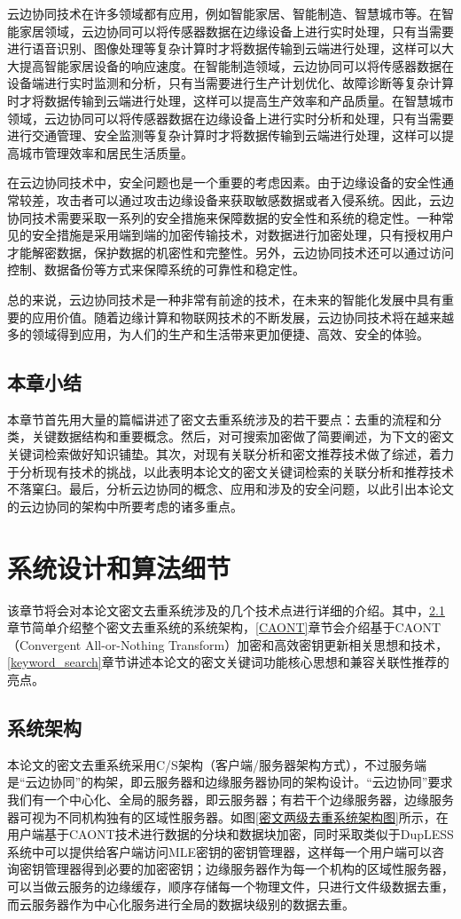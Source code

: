 \documentclass[promaster]{thesis-uestc}
\begin{document}
云边协同技术在许多领域都有应用，例如智能家居、智能制造、智慧城市等。在智能家居领域，云边协同可以将传感器数据在边缘设备上进行实时处理，只有当需要进行语音识别、图像处理等复杂计算时才将数据传输到云端进行处理，这样可以大大提高智能家居设备的响应速度。在智能制造领域，云边协同可以将传感器数据在设备端进行实时监测和分析，只有当需要进行生产计划优化、故障诊断等复杂计算时才将数据传输到云端进行处理，这样可以提高生产效率和产品质量。在智慧城市领域，云边协同可以将传感器数据在边缘设备上进行实时分析和处理，只有当需要进行交通管理、安全监测等复杂计算时才将数据传输到云端进行处理，这样可以提高城市管理效率和居民生活质量。

在云边协同技术中，安全问题也是一个重要的考虑因素。由于边缘设备的安全性通常较差，攻击者可以通过攻击边缘设备来获取敏感数据或者入侵系统。因此，云边协同技术需要采取一系列的安全措施来保障数据的安全性和系统的稳定性。一种常见的安全措施是采用端到端的加密传输技术，对数据进行加密处理，只有授权用户才能解密数据，保护数据的机密性和完整性。另外，云边协同技术还可以通过访问控制、数据备份等方式来保障系统的可靠性和稳定性。

总的来说，云边协同技术是一种非常有前途的技术，在未来的智能化发展中具有重要的应用价值。随着边缘计算和物联网技术的不断发展，云边协同技术将在越来越多的领域得到应用，为人们的生产和生活带来更加便捷、高效、安全的体验。
\section{本章小结}
本章节首先用大量的篇幅讲述了密文去重系统涉及的若干要点：去重的流程和分类，关键数据结构和重要概念。然后，对可搜索加密做了简要阐述，为下文的密文关键词检索做好知识铺垫。其次，对现有关联分析和密文推荐技术做了综述，着力于分析现有技术的挑战，以此表明本论文的密文关键词检索的关联分析和推荐技术不落窠臼。最后，分析云边协同的概念、应用和涉及的安全问题，以此引出本论文的云边协同的架构中所要考虑的诸多重点。

\chapter{系统设计和算法细节}\label{系统设计和技术细节}
该章节将会对本论文密文去重系统涉及的几个技术点进行详细的介绍。其中，\ref{系统架构}章节简单介绍整个密文去重系统的系统架构，\ref{CAONT}章节会介绍基于CAONT（Convergent All-or-Nothing Transform）加密和高效密钥更新相关思想和技术，\ref{keyword_search}章节讲述本论文的密文关键词功能核心思想和兼容关联性推荐的亮点。

\section{系统架构}\label{系统架构}
本论文的密文去重系统采用C/S架构（客户端/服务器架构方式），不过服务端是“云边协同”的构架，即云服务器和边缘服务器协同的架构设计。“云边协同”要求我们有一个中心化、全局的服务器，即云服务器；有若干个边缘服务器，边缘服务器可视为不同机构独有的区域性服务器。如图\ref{密文两级去重系统架构图}所示，在用户端基于CAONT技术进行数据的分块和数据块加密，同时采取类似于DupLESS系统中可以提供给客户端访问MLE密钥的密钥管理器，这样每一个用户端可以咨询密钥管理器得到必要的加密密钥；边缘服务器作为每一个机构的区域性服务器，可以当做云服务的边缘缓存，顺序存储每一个物理文件，只进行文件级数据去重，而云服务器作为中心化服务进行全局的数据块级别的数据去重。
\end{document}
